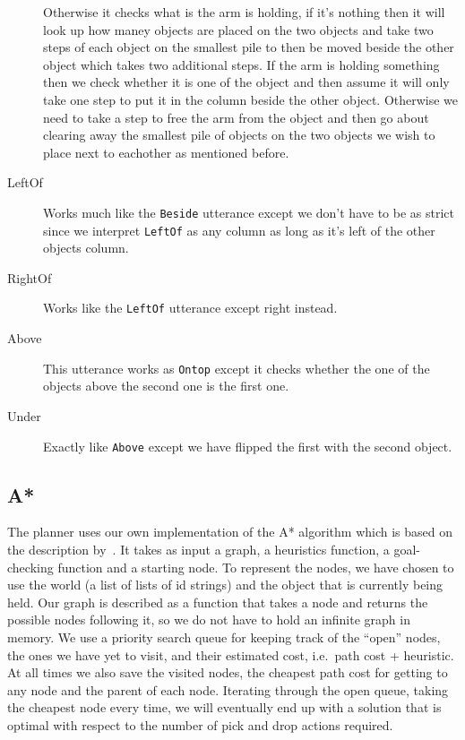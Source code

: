 \begin{description}
    Otherwise it checks what is the arm is holding, if it's nothing then it will look up how maney objects are placed on the two objects and take two steps of each object on the smallest pile to then be moved beside the other object which takes two additional steps.
    If the arm is holding something then we check whether it is one of the object and then assume it will only take one step to put it in the column beside the other object.
    Otherwise we need to take a step to free the arm from the object and then go about clearing away the smallest pile of objects on the two objects we wish to place next to eachother as mentioned before.
  \item[LeftOf] Works much like the \verb|Beside| utterance except we don't have to be as strict since we interpret \verb|LeftOf| as any column as long as it's left of the other objects column.
  \item[RightOf] Works like the \verb|LeftOf| utterance except right instead.
  \item[Above] This utterance works as \verb|Ontop| except it checks whether the one of the objects above the second one is the first one.
  \item[Under] Exactly like \verb|Above| except we have flipped the first with the second object.
\end{description}

\subsection*{A*}
The planner uses our own implementation of the A* algorithm which is based on the description by~\cite{apath}.
It takes as input a graph, a heuristics function, a goal-checking function and a starting node.
To represent the nodes, we have chosen to use the world (a list of lists of id strings) and the object that is currently being held.
Our graph is described as a function that takes a node and returns the possible nodes following it, so we do not have to hold an infinite graph in memory.
We use a priority search queue for keeping track of the ``open'' nodes, the ones we have yet to visit, and their estimated cost, i.e.\ path cost + heuristic.
At all times we also save the visited nodes, the cheapest path cost for getting to any node and the parent of each node.
Iterating through the open queue, taking the cheapest node every time, we will eventually end up with a solution that is optimal with respect to the number of pick and drop actions required.


